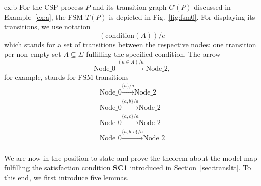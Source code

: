 \begin{example}{ex:b}
For the CSP process $P$ and its transition graph $G(P)$ discussed in
Example~\ref{ex:a}, the FSM $T(P)$ is depicted in Fig.~\ref{fig:fsm0}. For
displaying its transitions, we use notation
$$
(\text{condition}(A)) / e
$$
which stands for a set of transitions between the respective nodes: one transition per non-empty set $A\subseteq \Sigma$ fulfilling the specified condition.
The arrow
$$
\text{Node\_0} \xrightarrow{(a\in A) / a} \text{Node\_2},
$$
for example, stands for FSM transitions
$$
\begin{array}{l}
\text{Node\_0} \xrightarrow{\{a\}/a} \text{Node\_2} \\
\text{Node\_0} \xrightarrow{\{a,b\}/a} \text{Node\_2} \\
\text{Node\_0} \xrightarrow{\{a,c\}/a} \text{Node\_2} \\
\text{Node\_0} \xrightarrow{\{a,b,c\}/a} \text{Node\_2} \\
\end{array}
$$
\end{example}
%
\noindent%
We are now in the position to state and prove the theorem about the model map
fulfilling the satisfaction condition {\bf SC1} introduced in
Section~\ref{sec:transltt}. To this end, we first introduce five lemmas.

